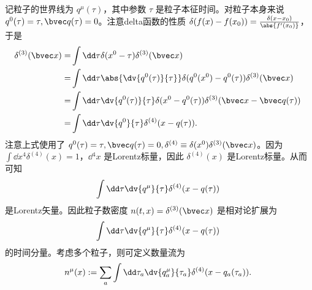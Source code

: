 记粒子的世界线为 $q^\mu(\tau)$，其中参数 $\tau$ 是粒子本征时间。对粒子本身来说 $q^0(\tau)=\tau,\bvec q(\tau)=0$。注意delta函数的性质 $\delta(f(x)-f(x_0))=\frac{\delta(x-x_0)}{\abs{f'(x_0)}}$，于是
\begin{equation}
\begin{aligned}
\delta^{(3)}(\bvec x)=&\int\dd \tau\delta(x^0-\tau)\delta^{(3)}(\bvec x)\\
=&\int\dd \tau\abs{\dv{q^0(\tau)}{\tau}}\delta(q^0(x^0)-q^0(\tau))\delta^{(3)}(\bvec x)\\
=&\int\dd \tau\dv{q^0(\tau)}{\tau}\delta(x^0-q^0(\tau))\delta^{(3)}(\bvec x-\bvec q(\tau))\\
=&\int\dd \tau\dv{q^0}{\tau}\delta^{(4)}(x-q(\tau)).\\
\end{aligned}~
\end{equation}
注意上式使用了 $q^0(\tau)=\tau,\bvec q(\tau)=0,\delta^{(4)}\equiv\delta(x^0)\delta^{(3)}(\bvec x)$。因为 $\int\dd x^4\delta^{(4)}(x)=1$，$\dd{^4}x$ 是Lorentz标量，因此 $\delta^{(4)}(x)$ 是Lorentz标量。从而可知 
\begin{equation}
\int\dd \tau\dv{q^\mu}{\tau}\delta^{(4)}(x-q(\tau))~
\end{equation}
是Lorentz矢量。因此粒子数密度 $n(t,x)=\delta^{(3)}(\bvec x)$ 是相对论扩展为
\begin{equation}
\int\dd \tau\dv{q^\mu}{\tau}\delta^{(4)}(x-q(\tau))~
\end{equation}
的时间分量。考虑多个粒子，则可定义数量流为
\begin{equation}
n^\mu(x):=\sum_a\int\dd \tau_a\dv{q_a^\mu}{\tau_a}\delta^{(4)}(x-q_a(\tau_a)).~
\end{equation}



















